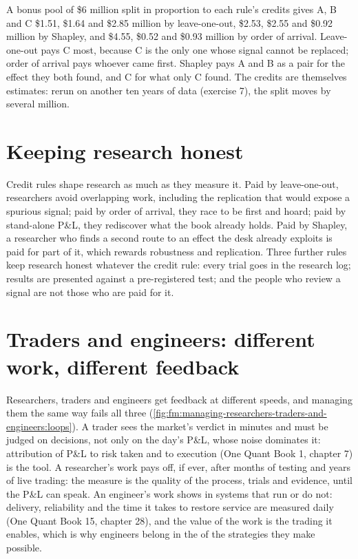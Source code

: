 A bonus pool of \$6 million split in proportion to each rule's credits gives A, B and C \$1.51, \$1.64 and \$2.85 million by leave-one-out, \$2.53,
\$2.55 and \$0.92 million by Shapley, and \$4.55, \$0.52 and \$0.93 million by order of arrival. Leave-one-out pays C most, because C is the only
one whose signal cannot be replaced; order of arrival pays whoever came first. Shapley pays A and B as a pair for the effect they both found, and C
for what only C found. The credits are themselves estimates: rerun on another ten years of data (exercise 7), the split moves by several million.

\section{Keeping research honest}

Credit rules shape research as much as they measure it. Paid by leave-one-out, researchers avoid overlapping work, including the replication
that would expose a spurious signal; paid by order of arrival, they race to be first and hoard; paid by stand-alone P\&L, they rediscover what the
book already holds. Paid by Shapley, a researcher who finds a second route to an effect the desk already exploits is paid for part of it, which
rewards robustness and replication. Three further rules keep research honest whatever the credit rule: every trial goes in the research log;
results are presented against a pre-registered test; and the people who review a signal are not those who are paid for it.

\section{Traders and engineers: different work, different feedback}

Researchers, traders and engineers get feedback at different speeds, and managing them the same way fails all three
(\cref{fig:fm:managing-researchers-traders-and-engineers:loops}). A trader sees the market's verdict in minutes and must be judged on decisions,
not only on the day's P\&L, whose noise dominates it: attribution of P\&L to risk taken and to execution (One Quant Book 1, chapter 7) is the
tool. A researcher's work pays off, if ever, after months of testing and years of live trading: the measure is the quality of the process, trials
and evidence, until the P\&L can speak. An engineer's work shows in systems that run or do not: delivery, reliability and the time it takes to
restore service are measured daily (One Quant Book 15, chapter 28), and the value of the work is the trading it enables, which is why engineers
belong in the  of the strategies they make possible.

